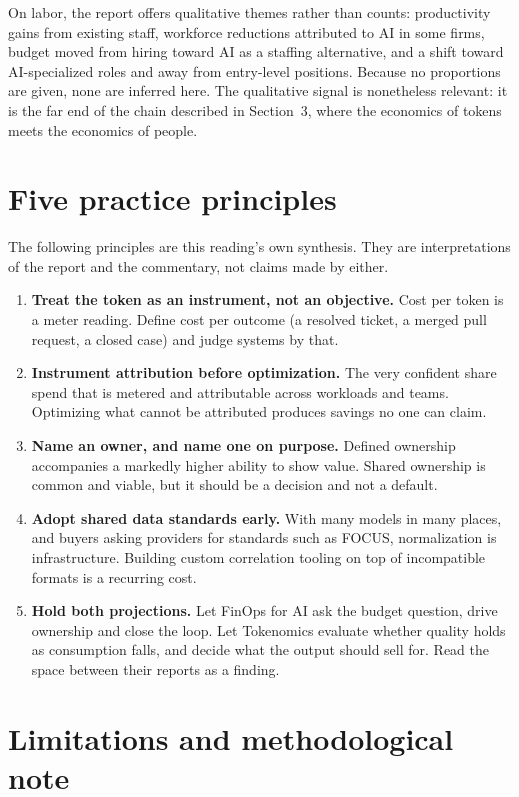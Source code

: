 \documentclass[11pt,a4paper]{article}
\begin{document}
On labor, the report offers qualitative themes rather than counts: productivity gains from existing staff, workforce reductions attributed to AI in some firms, budget moved from hiring toward AI as a staffing alternative, and a shift toward AI-specialized roles and away from entry-level positions. Because no proportions are given, none are inferred here. The qualitative signal is nonetheless relevant: it is the far end of the chain described in Section~3, where the economics of tokens meets the economics of people.

\section{Five practice principles}

The following principles are this reading's own synthesis. They are interpretations of the report and the commentary, not claims made by either.

\begin{enumerate}[leftmargin=1.6em, itemsep=0.2em]
\item \textbf{Treat the token as an instrument, not an objective.} Cost per token is a meter reading. Define cost per outcome (a resolved ticket, a merged pull request, a closed case) and judge systems by that.
\item \textbf{Instrument attribution before optimization.} The very confident share spend that is metered and attributable across workloads and teams. Optimizing what cannot be attributed produces savings no one can claim.
\item \textbf{Name an owner, and name one on purpose.} Defined ownership accompanies a markedly higher ability to show value. Shared ownership is common and viable, but it should be a decision and not a default.
\item \textbf{Adopt shared data standards early.} With many models in many places, and buyers asking providers for standards such as FOCUS, normalization is infrastructure. Building custom correlation tooling on top of incompatible formats is a recurring cost.
\item \textbf{Hold both projections.} Let FinOps for AI ask the budget question, drive ownership and close the loop. Let Tokenomics evaluate whether quality holds as consumption falls, and decide what the output should sell for. Read the space between their reports as a finding.
\end{enumerate}

\section{Limitations and methodological note}
\label{sec:limits}
\end{document}
